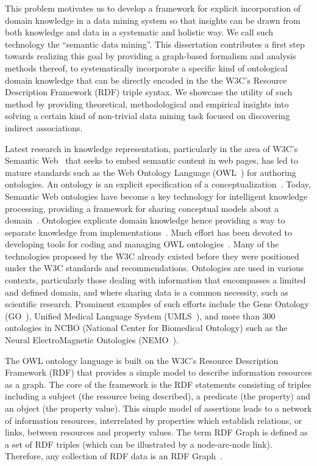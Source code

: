 This problem motivates us to develop a framework for explicit incorporation of domain knowledge in a data mining system so that insights can be drawn from both knowledge and data in a systematic and holistic way. We call such technology the ``semantic data mining''. This dissertation contributes a first step towards realizing this goal by providing a graph-based formalism and analysis methods thereof, to systematically incorporate a specific kind of ontological domain knowledge that can be directly encoded in the the W3C's Resource Description Framework (RDF) triple syntax. We showcase the utility of such method by providing theoretical, methodological and empirical insights into solving a certain kind of non-trivial data mining task focused on discovering indirect associations.


Latest research in knowledge representation, particularly in the area of W3C's Semantic Web~\cite{Berners-Lee01} that seeks to embed semantic content in web pages, has led to mature standards such as the Web Ontology Language (OWL~\cite{OWL}) for authoring ontologies. An ontology is an explicit specification of a conceptualization~\cite{Gruber93}. Today, Semantic Web ontologies have become a key technology for intelligent knowledge processing, providing a framework for sharing conceptual models about a domain~\cite{Maedche03Onto}. Ontologies explicate domain knowledge hence providing a way to separate knowledge from implementations~\cite{Noy01ontologydevelopment}. Much effort has been devoted to developing tools for coding and managing OWL ontologies~\cite{Duineveld00, Knublauch04}. Many of the technologies proposed by the W3C already existed before they were positioned under the W3C standards and recommendations. Ontologies are used in various contexts, particularly those dealing with information that encompasses a limited and defined domain, and where sharing data is a common necessity, such as scientific research. Prominent examples of such efforts include the Gene Ontology (GO~\cite{GO}), Unified Medical Language System (UMLS~\cite{UMLS}), and more than 300 ontologies in NCBO (National Center for Biomedical Ontology) such as the Neural ElectroMagnetic Ontologies (NEMO~\cite{FrishkoffEtal07, FrishkoffEtal09}).


The OWL ontology language is built on the W3C's Resource Description Framework (RDF) that provides a simple model to describe information resources as a graph. The core of the framework is the RDF statements consisting of triples including a subject (the resource being described), a predicate (the property) and an object (the property value). This simple model of assertions leads to a network of information resources, interrelated by properties which establish relations, or links, between resources and property values. The term RDF Graph is defined as a set of RDF triples (which can be illustrated by a node-arc-node link). Therefore, any collection of RDF data is an RDF Graph~\cite{GraphModelRDF}.

